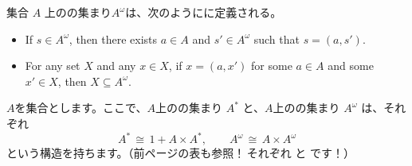 \documentclass[
		head_space=20mm,
		foot_space=20mm,
		gutter=10mm,
		line_length=190mm
]{jlreq}
\begin{document}
\begin{definition}[ストリーム]
	集合 $A$ 上のの集まり$A^\omega$は、次のようにに定義される。
	\begin{itemize}
		\item If $s\in A^\omega$, then there exists $a\in A$ and $s'\in A^\omega$ such that $s=(a,s')$. 
		\item For any set $X$ and any $x\in X$, if $x=(a,x')$ for some $a\in A$ and some $x'\in X$, then $X\subseteq A^\omega$.
	\end{itemize}
\end{definition}

\noindent $A$を集合とします。ここで、$A$上のの集まり $A^\ast$ と、$A$上のの集まり $A^\omega$ は、それぞれ
\[A^\ast\,\cong\,1+A\times A^\ast,\qquad A^\omega\,\cong\,A\times A^\omega\]
という構造を持ちます。（前ページの表も参照！\,それぞれ  と  です！）
\end{document}
